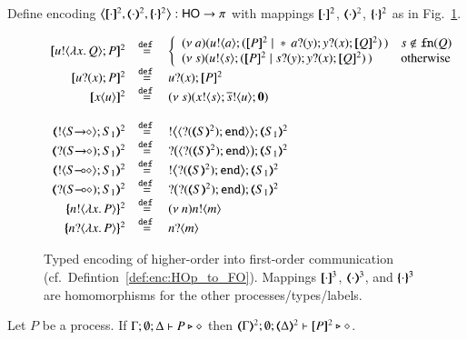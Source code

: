 \begin{definition}\rm
\label{def:enc:HOp_to_FO}
	Define encoding
	$\enco{\map{\cdot}^2, \mapt{\cdot}^2, \mapa{\cdot}^2}: \HO \to \sessp$
	with mappings 
	$[\!\![\cdot]\!\!]^{2}$, $(\!\!\langle\cdot\rangle\!\!)^{2}$, $\{\!\!\{\cdot\}\!\!\}^{2}$ as
	in Fig.~\ref{fig:enc:HOp_to_FO}.
\end{definition}
%
\begin{figure}[t]
	\[
	\begin{array}{rcl}
		\pmap{\bout{u}{\abs{x}{Q}} P}{2} & \defeq &  \left\{
		\begin{array}{ll}
			\newsp{a}{\bout{u}{a} (\pmap{P}{2} \Par \repl{} \binp{a}{y} \binp{y}{x} \pmap{Q}{2})\,} & s \notin \fn{Q} \\
			\newsp{s}{\bout{u}{s} (\pmap{P}{2} \Par \binp{s}{y} \binp{y}{x} \pmap{Q}{2})\,} & \textrm{otherwise} %
		\end{array}
		\right.
		\\
		\pmap{\binp{u}{x} P}{2} &\defeq&  \binp{u}{x} \pmap{P}{2}\\
		\pmap{\appl{x}{u}}{2} & \defeq & \newsp{s}{\bout{x}{s} \bout{\dual{s}}{u} \inact}
		\\
		\\
		\tmap{\btout{\shot{S}}S_1}{2} & \defeq & \bbtout{\chtype{\btinp{\tmap{S}{2}}\tinact}}\tmap{S_1}{2} \\
		\tmap{\btinp{\shot{S}}S_1}{2} & \defeq & \bbtinp{\chtype{\btinp{\tmap{S}{2}}\tinact}}\tmap{S_1}{2} \\

		\tmap{\btout{\lhot{S}}S_1}{2} & \defeq & \bbtout{\btinp{\tmap{S}{2}}\tinact}\tmap{S_1}{2} \\
		\tmap{\btinp{\lhot{S}}S_1}{2} & \defeq & \bbtinp{\btinp{\tmap{S}{2}}\tinact}\tmap{S_1}{2} \\
		\mapa{\bactout{n}{\abs{ x}{P}} }^{2} &  \defeq & \news{n} \bactout{n}{m} \\
		\mapa{\bactinp{n}{\abs{ x}{P}} }^{2} &  \defeq & \bactinp{n}{m}
	\end{array}
	\]
	\caption{
		Typed encoding of higher-order  into first-order communication (cf.~Defintion~\ref{def:enc:HOp_to_FO}).
		\label{fig:enc:HOp_to_FO}
		Mappings 
		$[\!\![\cdot]\!\!]^3$,
		$(\!\!\langle\cdot\rangle\!\!)^3$, 
		and 
		$\{\!\!\{\cdot\}\!\!\}^3$
		are homomorphisms for the other processes/types/labels. 
	}
\end{figure}


\begin{proposition}\rm
\label{prop:typepres_HOp_to_FO}
	Let $P$ be a \HOp process. 
	If $\Gamma; \emptyset; \Delta \vdash P \triangleright \diamond$ then 
	$\mapt{\Gamma}^{2}; \emptyset; \mapt{\Delta}^{2} \proves \map{P}^{2} \hastype \Proc$.
\end{proposition}

